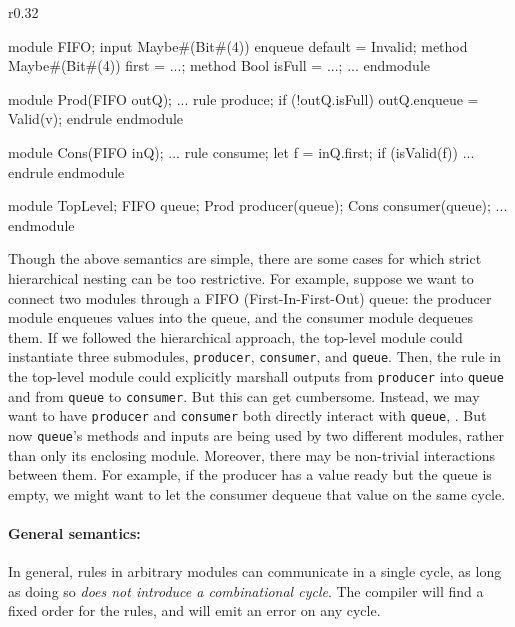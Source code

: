 \begin{wrapfigure}{r}{0.32\columnwidth}
\vspace{-4em}
\begin{mscode}
module FIFO;
  input Maybe#(Bit#(4))
   enqueue default = Invalid;
  method Maybe#(Bit#(4))
   first = ...;
  method Bool isFull = ...;
  ...
endmodule

module Prod(FIFO outQ);
  ...
  rule produce;
    if (!outQ.isFull)
     outQ.enqueue = Valid(v);
  endrule
endmodule

module Cons(FIFO inQ);
  ...
  rule consume;
    let f = inQ.first;
    if (isValid(f)) ...
  endrule
endmodule

module TopLevel;
  FIFO queue;
  Prod producer(queue);
  Cons consumer(queue);
  ...
endmodule
\end{mscode}
\vspace{-4em}
\end{wrapfigure}



Though the above semantics are simple, there are some cases for which strict hierarchical nesting can be too restrictive.
For example, suppose we want to connect two modules through a FIFO (First-In-First-Out) queue:
the producer module enqueues values into the queue, and the consumer module dequeues them.
If we followed the hierarchical approach, the top-level module could instantiate three submodules,
\texttt{producer}, \texttt{consumer}, and \texttt{queue}.
Then, the rule in the top-level module could explicitly marshall outputs
from \texttt{producer} into \texttt{queue} and from \texttt{queue} to \texttt{consumer}.
But this can get cumbersome.
Instead, we may want to have \texttt{producer} and \texttt{consumer} both directly
interact with \texttt{queue}, .
But now \texttt{queue}'s methods and inputs are being used by two different modules,
rather than only its enclosing module.
Moreover, there may be non-trivial interactions between them.
For example, if the producer has a value ready but the queue is empty,
we might want to let the consumer dequeue that value on the same cycle.

\paragraph{General semantics:}
In general, rules in arbitrary modules can communicate in a single cycle, as long as
doing so \emph{does not introduce a combinational cycle}.
The compiler will find a fixed order for the rules, and will emit an error on any cycle.

